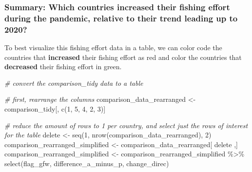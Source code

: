 \documentclass[
]{article}
\newenvironment{Shaded}{\begin{snugshade}}{\end{snugshade}}
\newcommand{\CommentTok}[1]{\textcolor[rgb]{0.56,0.35,0.01}{\textit{#1}}}
\newcommand{\DecValTok}[1]{\textcolor[rgb]{0.00,0.00,0.81}{#1}}
\newcommand{\FunctionTok}[1]{\textcolor[rgb]{0.00,0.00,0.00}{#1}}
\newcommand{\NormalTok}[1]{#1}
\newcommand{\OtherTok}[1]{\textcolor[rgb]{0.56,0.35,0.01}{#1}}
\newcommand{\SpecialCharTok}[1]{\textcolor[rgb]{0.00,0.00,0.00}{#1}}
\begin{document}
\hypertarget{summary-which-countries-increased-their-fishing-effort-during-the-pandemic-relative-to-their-trend-leading-up-to-2020}{%
\subsubsection{Summary: Which countries increased their fishing effort
during the pandemic, relative to their trend leading up to
2020?}\label{summary-which-countries-increased-their-fishing-effort-during-the-pandemic-relative-to-their-trend-leading-up-to-2020}}

To best visualize this fishing effort data in a table, we can color code
the countries that \textbf{increased} their fishing effort as red and
color the countries that \textbf{decreased} their fishing effort in
green.

\begin{Shaded}
\begin{Highlighting}[]
\CommentTok{\# convert the comparison\_tidy data to a table}

\CommentTok{\# first, rearrange the columns}
\NormalTok{comparison\_data\_rearranged }\OtherTok{\textless{}{-}}\NormalTok{ comparison\_tidy[, }\FunctionTok{c}\NormalTok{(}\DecValTok{1}\NormalTok{, }\DecValTok{5}\NormalTok{, }\DecValTok{4}\NormalTok{, }\DecValTok{2}\NormalTok{, }\DecValTok{3}\NormalTok{)]}

\CommentTok{\# reduce the amount of rows to 1 per country, and select just the rows of interest for the table}
\NormalTok{delete }\OtherTok{\textless{}{-}} \FunctionTok{seq}\NormalTok{(}\DecValTok{1}\NormalTok{, }\FunctionTok{nrow}\NormalTok{(comparison\_data\_rearranged), }\DecValTok{2}\NormalTok{)}
\NormalTok{comparison\_rearranged\_simplified }\OtherTok{\textless{}{-}}\NormalTok{ comparison\_data\_rearranged[ delete ,]}
\NormalTok{comparison\_rearranged\_simplified }\OtherTok{\textless{}{-}}\NormalTok{ comparison\_rearranged\_simplified }\SpecialCharTok{\%\textgreater{}\%} 
  \FunctionTok{select}\NormalTok{(flag\_gfw, difference\_a\_minus\_p, change\_direc)}


\end{Highlighting}
\end{Shaded}
\end{document}
